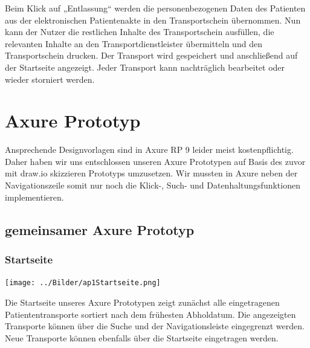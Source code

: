 \documentclass[a4paper, ngerman, 12pt]{scrartcl}
\begin{document}
Beim Klick auf „Entlassung“ werden die personenbezogenen Daten des Patienten aus der elektronischen Patientenakte in den Transportschein übernommen. Nun kann der Nutzer die restlichen Inhalte des Transportschein ausfüllen, die relevanten Inhalte an den Transportdienstleister übermitteln und den Transportschein drucken. Der Transport wird gespeichert und anschließend auf der Startseite angezeigt. Jeder Transport kann nachträglich bearbeitet oder wieder storniert werden.
\section{Axure Prototyp}
Ansprechende Designvorlagen sind in Axure RP 9 leider meist kostenpflichtig. Daher haben wir uns entschlossen unseren Axure Prototypen auf Basis des zuvor mit draw.io skizzieren Prototyps umzusetzen. Wir mussten in Axure neben der Navigationszeile somit nur noch die Klick-, Such- und Datenhaltungsfunktionen implementieren.
\subsection{gemeinsamer Axure Prototyp}
\subsubsection{Startseite}
\begin{center}
\begin{minipage}{0.8\textwidth}
	\centering
	\texttt{[image: ../Bilder/ap1Startseite.png]}
	\label{img:ap1start}
\end{minipage}
\end{center}
Die Startseite unseres Axure Prototypen zeigt zunächst alle eingetragenen Patiententransporte sortiert nach dem frühesten Abholdatum. Die angezeigten Transporte können über die Suche und der Navigationsleiste eingegrenzt werden. Neue Transporte können ebenfalls über die Startseite eingetragen werden.
\end{document}
